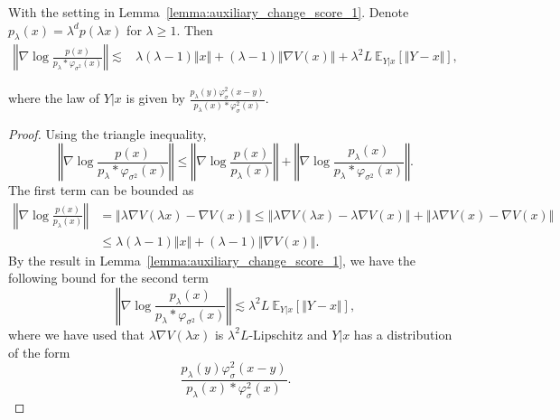 \begin{lemma}\label{lemma:auxiliary_change_score_2}
 With the setting in Lemma~\ref{lemma:auxiliary_change_score_1}. Denote $p_\lambda(x)=\lambda^d p(\lambda x)$ for $\lambda\geq 1$. Then 
    \begin{align*}
        \left\Vert \nabla \log \frac{p(x)}{p_\lambda *\varphi_{\sigma^2}(x)} \right\Vert\lesssim& \lambda (\lambda-1) \Vert x\Vert + (\lambda-1)\Vert \nabla V(x)\Vert+ \lambda^2 L\ \mathbb{E}_{Y|x}\left[\Vert Y- x\Vert\right],
    \end{align*}
\end{lemma}
where the law of $Y|x$ is given by $\frac{p_\lambda(y)\varphi_\sigma^2(x-y)}{p_\lambda(x)*\varphi_\sigma^2(x)}$.
\begin{proof}
Using the triangle inequality,
\begin{equation*}
    \left\Vert \nabla \log \frac{p(x)}{p_{\lambda}*\varphi_{\sigma^2}(x)}\right\Vert \leq \left\Vert \nabla \log \frac{p(x)}{p_\lambda(x)}\right\Vert + \left\Vert \nabla \log \frac{p_\lambda(x)}{p_{\lambda}*\varphi_{\sigma^2}(x)}\right\Vert.
\end{equation*}
The first term can be bounded as
\begin{align*}
    \left\Vert \nabla \log \frac{p(x)}{p_\lambda(x)}\right\Vert &= \left\Vert \lambda \nabla V(\lambda x)-\nabla V(x)\right\Vert \leq \left\Vert \lambda \nabla V(\lambda x)-\lambda\nabla V(x)\right\Vert+ \left\Vert \lambda \nabla V(x)-\nabla V(x)\right\Vert \\
    & \leq \lambda (\lambda-1) \Vert x\Vert + (\lambda-1)\Vert \nabla V(x)\Vert.
\end{align*}
By the result in Lemma~\ref{lemma:auxiliary_change_score_1}, we have the following bound for the second term
\begin{equation*}
    \left\Vert \nabla \log \frac{p_\lambda(x)}{p_{\lambda}*\varphi_{\sigma^2}(x)}\right\Vert \lesssim \lambda^2 L\ \mathbb{E}_{Y|x}\left[\Vert Y-x\Vert\right],
\end{equation*}
where we have used that $\lambda \nabla V(\lambda x)$ is $\lambda^2 L$-Lipschitz and $Y|x$ has a distribution of the form
\begin{equation*}
    \frac{p_\lambda(y)\varphi_\sigma^2(x-y)}{p_\lambda(x)*\varphi_\sigma^2(x)}.
\end{equation*}
\end{proof}



